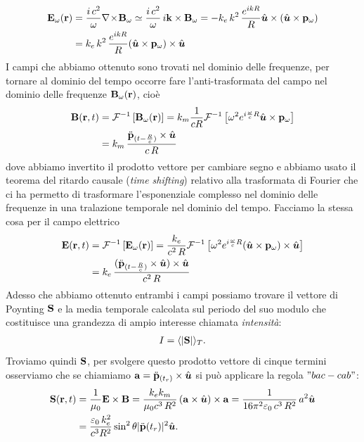 \begin{align}
  \mathbf{E}_\omega(\mathbf{r}) &= \frac{i\,c^2}{\omega} \nabla\!\times\!\mathbf{ B }_\omega \simeq \frac{i\,c^2}{\omega} \, i\mathbf{k} \times \mathbf{B}_\omega 
  = -k_e \, k^2\, \frac{e^{ikR}}{R} \hat{\boldsymbol{u}} \times (\hat{\boldsymbol{u}} \times \mathbf{p}_\omega)
  \\
  &= k_e \, k^2\, \frac{e^{ikR}}{R} (\hat{\boldsymbol{u}} \times \mathbf{p}_\omega) \times \hat{\boldsymbol{u}}
\end{align}
I campi che abbiamo ottenuto sono trovati nel dominio delle frequenze, per tornare al dominio del tempo occorre fare l'anti-trasformata del campo nel 
dominio delle frequenze $ \mathbf{B}_\omega(\mathbf{r}) $, cioè
\begin{align}
  \mathbf{B}(\mathbf{r},t) &= \mathcal{F}^{-1} \left[ \mathbf{B}_\omega(\mathbf{r}) \right] 
  = k_m \frac1{cR} \mathcal{F}^{-1} \left[ {\omega^2} e^{i\frac{\omega}{c} R} \hat{\boldsymbol{u}} \times \mathbf{p}_\omega \right]
  \\
  &= k_m \, \frac{\ddot{\mathbf{p}}_{(t - \frac{R}{c})} \times \hat{\boldsymbol{u}} }{c\,R} 
\end{align}
dove abbiamo invertito il prodotto vettore per cambiare segno e abbiamo usato il teorema del ritardo causale (\textit{time shifting}) relativo alla 
trasformata di Fourier che ci ha permetto di trasformare l'esponenziale complesso nel dominio delle frequenze in una tralazione temporale nel dominio 
del tempo. Facciamo la stessa cosa per il campo elettrico
\begin{align}
  \mathbf{E}(\mathbf{r},t) &= \mathcal{F}^{-1} \left[ \mathbf{E}_\omega(\mathbf{r}) \right]
  = \frac{k_e}{c^2\,R} \mathcal{F}^{-1} \left[ {\omega^2} e^{i\frac{\omega}{c} R} (\hat{\boldsymbol{u}} \times \mathbf{p}_\omega) \times \hat{\boldsymbol{u}} \right]
  \\
  &= k_e \,\frac{( \ddot{\mathbf{p}}_{(t - \frac{R}{c})} \times \hat{\boldsymbol{u}} ) \times \hat{\boldsymbol{u}}}{c^2 \,R} 
\end{align}
Adesso che abbiamo ottenuto entrambi i campi possiamo trovare il vettore di Poynting $ \mathbf{S} $ e la media temporale calcolata sul periodo del suo modulo che 
costituisce una grandezza di ampio interesse chiamata \textit{intensità}:
\begin{align} 
  I = \langle |\mathbf{S}| \rangle_T.
\end{align}
Troviamo quindi $ \mathbf{S} $, per svolgere questo prodotto vettore di cinque termini osserviamo che se chiamiamo 
$ \mathbf{a} = \ddot{\mathbf{p}}_{(t_r)} \times \hat{\boldsymbol{u}} $ si può applicare la regola $"{bac-cab}"$:
\begin{align}
  \mathbf{S} (\mathbf{r}, t) &= \frac{1}{\mu_0} \mathbf{E} \times \mathbf{B} = \frac{k_e  k_m }{\mu_0 c^3\, R^2}\, (\mathbf{a}\times \hat{\boldsymbol{u}}) \times \mathbf{a} 
  = \frac{1}{16 \pi^2 \varepsilon_0 \, c^3\,R^2}\,a^2 \hat{\boldsymbol{u}}
  \\
  &= \frac{\varepsilon_0 \,k_e^2 }{c^3 R^2} \sin^2\theta\lvert \ddot{\mathbf{p}}(t_r) \rvert^2 \hat{\boldsymbol{u}}.
\end{align}
